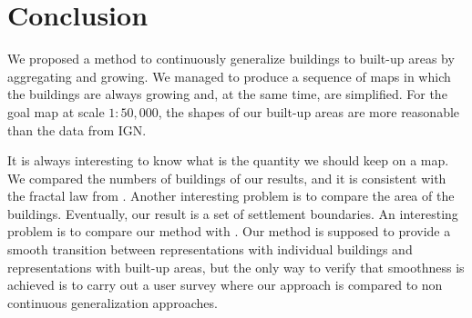 

\section{Conclusion}
\label{sec:Conclusion}

We proposed a method to continuously generalize buildings to built-up areas
by aggregating and growing.
We managed to produce a sequence of maps 
in which the buildings are always growing and, at the same time, are simplified.
For the goal map at scale $1:50{,}000$,
the shapes of our built-up areas are more reasonable than the data from IGN.

It is always interesting to know what is the quantity we should keep on a map.
We compared the numbers of buildings of our results, and it is consistent with 
the fractal law from \citet{Jiang2015}.
Another interesting problem is to compare the area of the buildings.
Eventually, our result is a set of settlement boundaries. An interesting 
problem is to compare our method with \citet{Chaudhry2008}.
Our method is supposed to provide a smooth transition between representations 
with individual buildings and representations with built-up areas, but the only 
way to verify that smoothness is achieved is to carry out a user survey where 
our approach is compared to non continuous generalization approaches.



